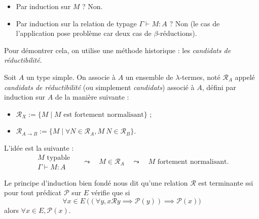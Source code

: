 \documentclass[./main]{subfiles}
\begin{document}
  \begin{rmk}
    \begin{itemize}
      \item Par induction sur $M$ ? Non.
      \item Par induction sur la relation de typage $\Gamma \vdash M : A$ ? Non (le cas de l'application pose problème car deux cas de $\beta$-réductions).
    \end{itemize}
  \end{rmk}
  Pour démontrer cela, on utilise une méthode historique : les \textit{candidats de réductibilité}.
  \begin{defn}
    Soit $A$ un type simple.
    On associe à $A$ un ensemble de $\lambda$-termes, noté $\mathcal{R}_A$ appelé \textit{candidats de réductibilité} (ou simplement \textit{candidats}) associé à $A$, défini par induction sur $A$ de la manière suivante :
    \begin{itemize}
      \item $\mathcal{R}_X := \{M  \mid M \text{ est fortement normalisant}\}$ ;
      \item $\mathcal{R}_{A \to B} := \{M  \mid \forall N \in \mathcal{R}_A, M\: N \in \mathcal{R}_B\}$.
    \end{itemize}
  \end{defn}

  L'idée est la suivante : \[
  \begin{array}{c}
    M \text{ typable }\\
    \Gamma \vdash M : A
  \end{array} \quad\leadsto\quad M \in \mathcal{R}_A \quad\leadsto\quad M \text{ fortement normalisant}
  .\]

  \begin{rmk}
    Le principe d'induction bien fondé nous dit qu'une relation $\mathcal{R}$ est terminante ssi pour tout prédicat $\mathcal{P}$ sur $E$ vérifie que si \[
      \forall x \in E \: \big((\forall y, x \mathrel{\mathcal{R}} y \implies \mathcal{P}(y)) \implies \mathcal{P}(x)\big)
    \]
    alors $\forall x \in E, \mathcal{P}(x)$.
  \end{rmk}
\end{document}
